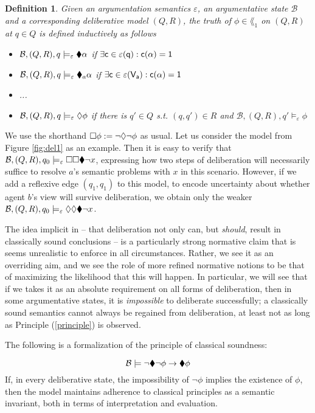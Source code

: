 \documentclass{article}
\newtheorem{definition}[thm]{Definition}
\newcommand{\clab}{\sf c}
\newcommand{\views}{\mathcal B}
\newcommand{\sem}{\varepsilon}
\begin{document}
\begin{definition}\label{truth1}
Given an argumentation semantics $\sem$, an argumentative state $\views$ and a corresponding deliberative model $(Q,R)$, the truth of $\phi \in \lang_1$ on $(Q,R)$ at $q \in Q$ is defined inductively as follows
\begin{itemize}
\item $\views, (Q,R),q\models_\sem \cdia \alpha$ if $\exists \clab \in \sem(q): \overline \clab(\alpha) = 1$
\item $\views,(Q,R),q\models_\sem \cdia_a \alpha$ if $\exists \clab \in \sem(V_a): \overline \clab(\alpha) = 1$
\item ...
\item $\views,(Q,R),q \models_\sem \adia \phi$ if there is $q' \in Q$ s.t. $(q,q') \in R$ and $\views,(Q,R),q' \models_\sem \phi$
\end{itemize}
\end{definition}
 
We use the shorthand $\square \phi := \neg \lozenge \neg \phi$ as usual. Let us consider the model from Figure \ref{fig:del1} as an example. Then it is easy to verify that $\views, (Q,R), q_0 \models_\sem \abox \abox \cdia \neg x$, expressing how two steps of deliberation will necessarily suffice to resolve $a$'s semantic problems with $x$ in this scenario. However, if we add a reflexive edge $(q_1,q_1)$ to this model, to encode uncertainty about whether agent $b$'s view will survive deliberation, we obtain only the weaker $\views, (Q,R),q_0 \models_\sem \adia \adia \cdia \neg x$.

The idea implicit in \cite{whyreason} -- that deliberation not only can, but \emph{should}, result in classically sound conclusions -- is a particularly strong normative claim that is seems unrealistic to enforce in all circumstances. Rather, we see it as an overriding aim, and we see the role of more refined normative notions to be that of maximizing the likelihood that this will happen. In particular, we will see that if we takes it as an absolute requirement on all forms of deliberation, then in some argumentative states, it is \emph{impossible} to deliberate successfully; a classically sound semantics cannot always be regained from deliberation, at least not as long as Principle (\ref{principle}) is observed.

The following is a formalization of the principle of classical soundness:

$$
\views \models \neg \cdia \neg \phi \to \cdia \phi
$$
If, in every deliberative state, the impossibility of $\neg \phi$ implies the existence of $\phi$, then the model maintains adherence to classical principles as a semantic invariant, both in terms of interpretation and evaluation.
\end{document}
